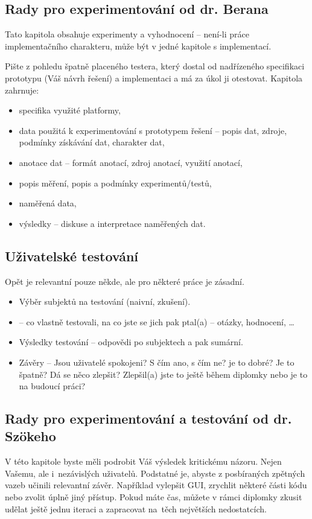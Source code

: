 \subsection*{Rady pro experimentování od dr. Berana}
Tato kapitola obsahuje experimenty a vyhodnocení -- není-li práce implementačního charakteru, může být v jedné kapitole s implementací.

Pište z pohledu špatně placeného testera, který dostal od nadřízeného specifikaci prototypu (Váš návrh řešení) a implementaci a má za úkol ji otestovat. Kapitola zahrnuje:
\begin{itemize}
  \item{specifika využité platformy,}
  \item{data použitá k experimentování s prototypem řešení -- popis dat, zdroje, podmínky získávání dat, charakter dat,}
  \item{anotace dat -- formát anotací, zdroj anotací, využití anotací,}
  \item{popis měření, popis a podmínky experimentů/testů,}
  \item{naměřená data,}
  \item{výsledky -- diskuse a interpretace naměřených dat.}
\end{itemize}

\subsection*{Uživatelské testování}

Opět je relevantní pouze někde, ale pro některé práce je zásadní.
\begin{itemize}
  \item{Výběr subjektů na testování (naivní, zkušení).}
  \item{ -- co vlastně testovali, na co jste se jich pak ptal(a) -- otázky, hodnocení, \ldots}
  \item{Výsledky testování -- odpovědi po subjektech a pak sumární.}
  \item{Závěry -- Jsou uživatelé spokojeni? S čím ano, s čím ne? je to dobré? Je to špatně? Dá se něco zlepšit? Zlepšil(a) jste to ještě během diplomky nebo je to na budoucí práci?}
\end{itemize}

\subsection*{Rady pro experimentování a testování od dr. Szökeho}
V této kapitole byste měli podrobit Váš výsledek kritickému názoru. Nejen Vašemu, ale i~nezávislých uživatelů. Podstatné je, abyste z posbíraných zpětných vazeb učinili relevantní závěr. Například vylepšit GUI, zrychlit některé části kódu nebo zvolit úplně jiný přístup. Pokud máte čas, můžete v rámci diplomky zkusit udělat ještě jednu iteraci a zapracovat na~těch největších nedostatcích.

